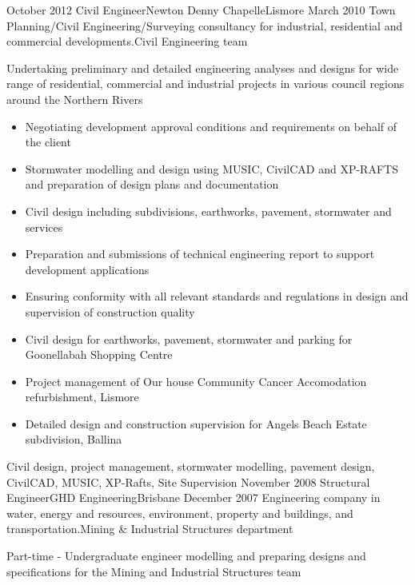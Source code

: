 \begin{experiences}
  \emptySeparator
  \consultantexperience
  {October 2012}       {Civil Engineer}{Newton Denny Chapelle}{Lismore}
  {March 2010}      {Town Planning/Civil Engineering/Surveying consultancy for industrial, residential and commercial developments.}{Civil Engineering team}
                    {Undertaking preliminary and detailed engineering analyses and designs for wide range of residential, commercial and industrial projects in various council regions around the Northern Rivers
           \begin{itemize}
		\item Negotiating development approval conditions and requirements on behalf of the client
		\item Stormwater modelling and design using MUSIC, CivilCAD and XP-RAFTS and preparation of design plans and documentation
		\item Civil design including subdivisions, earthworks, pavement, stormwater and services
		\item Preparation and submissions of technical engineering report to support development applications
		\item Ensuring conformity with all relevant standards and regulations in design and supervision of construction quality   
		\item Civil design for earthworks, pavement, stormwater and parking for Goonellabah Shopping Centre 
		\item Project management of Our house Community Cancer Accomodation refurbishment, Lismore
		\item Detailed design and construction supervision for Angels Beach Estate subdivision, Ballina      
               \end{itemize}
                    }
                    {Civil design, project management, stormwater modelling, pavement design, CivilCAD, MUSIC, XP-Rafts, Site Supervision}
  \emptySeparator
  \consultantexperience
  {November 2008}      {Structural Engineer}{GHD Engineering}{Brisbane}
  {December 2007}      {Engineering company in water, energy and resources, environment, property and buildings, and transportation.}{Mining \& Industrial Structures department}
   { Part-time - Undergraduate engineer modelling and preparing designs and specifications for the Mining and Industrial Structures team
                    
}
\end{experiences}
